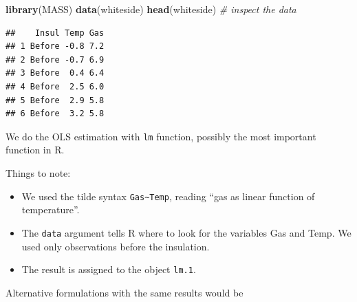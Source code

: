 \documentclass[]{book}
\newenvironment{Shaded}{\begin{snugshade}}{\end{snugshade}}
\newcommand{\KeywordTok}[1]{\textcolor[rgb]{0.13,0.29,0.53}{\textbf{{#1}}}}
\newcommand{\DataTypeTok}[1]{\textcolor[rgb]{0.13,0.29,0.53}{{#1}}}
\newcommand{\FloatTok}[1]{\textcolor[rgb]{0.00,0.00,0.81}{{#1}}}
\newcommand{\StringTok}[1]{\textcolor[rgb]{0.31,0.60,0.02}{{#1}}}
\newcommand{\CommentTok}[1]{\textcolor[rgb]{0.56,0.35,0.01}{\textit{{#1}}}}
\newcommand{\NormalTok}[1]{{#1}}
\providecommand{\tightlist}{%
  \setlength{\itemsep}{0pt}\setlength{\parskip}{0pt}}
\theoremstyle{definition}
\theoremstyle{definition}
\theoremstyle{remark}
\begin{document}
\begin{Shaded}
\begin{Highlighting}[]
\KeywordTok{library}\NormalTok{(MASS)}
\KeywordTok{data}\NormalTok{(whiteside)}
\KeywordTok{head}\NormalTok{(whiteside) }\CommentTok{# inspect the data}
\end{Highlighting}
\end{Shaded}

\begin{verbatim}
##    Insul Temp Gas
## 1 Before -0.8 7.2
## 2 Before -0.7 6.9
## 3 Before  0.4 6.4
## 4 Before  2.5 6.0
## 5 Before  2.9 5.8
## 6 Before  3.2 5.8
\end{verbatim}

We do the OLS estimation with \texttt{lm} function, possibly the most
important function in R.

\begin{Shaded}
\end{Shaded}

Things to note:

\begin{itemize}
\tightlist
\item
  We used the tilde syntax \texttt{Gas\textasciitilde{}Temp}, reading
  ``gas as linear function of temperature''.
\item
  The \texttt{data} argument tells R where to look for the variables Gas
  and Temp. We used only observations before the insulation.
\item
  The result is assigned to the object \texttt{lm.1}.
\end{itemize}

Alternative formulations with the same results would be

\begin{Shaded}
\end{Shaded}
\end{document}
